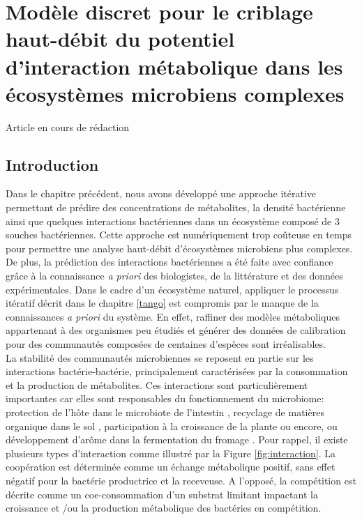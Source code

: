 \documentclass[../main.tex]{subfiles}
\begin{document}
\chapter{Modèle discret pour le criblage haut-débit du potentiel d'interaction métabolique dans les écosystèmes microbiens complexes}
\label{ccmc}
\minitoc
Article en cours de rédaction 


\newpage

\section{Introduction}
Dans le chapitre précédent, nous avons développé une approche itérative permettant de prédire des concentrations de métabolites, la densité bactérienne ainsi que quelques interactions bactériennes dans un écosystème composé de 3 souches bactériennes. Cette approche est numériquement trop coûteuse en temps pour permettre une analyse haut-débit d'écosystèmes microbiens plus complexes. De plus, la prédiction des interactions bactériennes a été faite avec confiance grâce à la connaissance \textit{a priori} des biologistes, de la littérature et des données expérimentales. Dans le cadre d'un écosystème naturel, appliquer le processus itératif décrit dans le chapitre \ref{tango} est compromis par le manque de la connaissances \textit{a priori} du système. En effet, raffiner des modèles métaboliques appartenant à des organismes peu étudiés et générer des données de calibration pour des communautés composées de centaines d'espèces sont irréalisables. \\

La stabilité des communautés microbiennes se reposent en partie sur les interactions bactérie-bactérie, principalement caractérisées par la consommation et la production de métabolites. Ces interactions sont particulièrement importantes car elles sont responsables du fonctionnement du microbiome: protection de l'hôte dans le microbiote de l'intestin \citep{WILMES20221201}, recyclage de matières organique dans le sol \citep{Rousk2016}, participation à la croissance de la plante \citep{FOURNIER202227} ou encore, ou développement d'arôme dans la fermentation du fromage \citep{Cao2021}. Pour rappel, il existe plusieurs types d'interaction comme illustré par la Figure \ref{fig:interaction}. La coopération est déterminée comme un échange métabolique positif, sans effet négatif pour la bactérie productrice et la receveuse. A l'opposé, la compétition est décrite comme un coe-consommation d'un substrat limitant impactant la croissance et /ou la production métabolique des bactéries en compétition.\\
\end{document}
